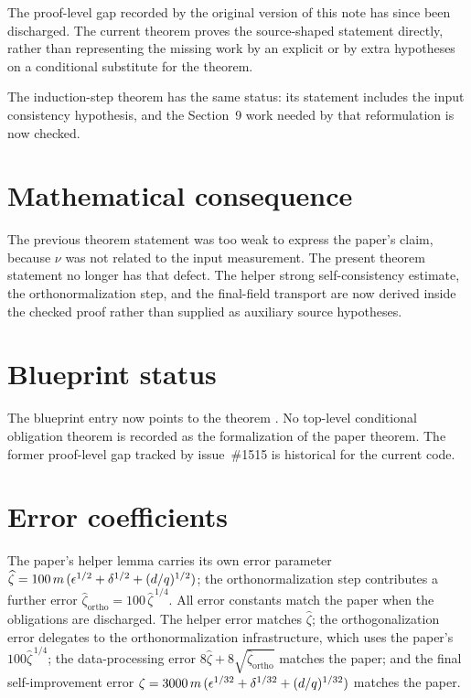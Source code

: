 \documentclass{article}
\begin{document}
The proof-level gap recorded by the original version of this note has since
been discharged.  The current theorem proves the source-shaped statement
directly, rather than representing the missing work by an explicit
 or by extra hypotheses on a conditional substitute for the
theorem.

The induction-step theorem
has the same status: its statement includes the input consistency hypothesis,
and the Section~9 work needed by that reformulation is now checked.

\section{Mathematical consequence}

The previous theorem statement was too weak to express the paper's claim,
because $\nu$ was not related to the input measurement.  The present theorem
statement no longer has that defect.  The helper strong self-consistency
estimate, the orthonormalization step, and the final-field transport are now
derived inside the checked proof rather than supplied as auxiliary source
hypotheses.

\section{Blueprint status}

The blueprint entry now points to the theorem .  No
top-level conditional obligation theorem is recorded as the formalization of
the paper theorem.  The former proof-level gap tracked by issue~\#1515 is
historical for the current code.

\section{Error coefficients}

The paper's helper lemma carries its own error parameter
$\widehat\zeta = 100\,m\,(\epsilon^{1/2}+\delta^{1/2}+(d/q)^{1/2})$;
the orthonormalization step contributes a further error
$\widehat\zeta_{\text{ortho}} = 100\,\widehat\zeta^{\,1/4}$.
All error constants match the paper when the obligations are discharged.
The helper error matches
$\widehat\zeta$; the orthogonalization error delegates to the
orthonormalization infrastructure, which uses the paper's $100\widehat\zeta^{\,1/4}$;
the data-processing error $8\widehat\zeta+8\sqrt{\widehat\zeta_{\text{ortho}}}$
matches the paper; and the final self-improvement error
$\zeta = 3000\,m\,(\epsilon^{1/32}+\delta^{1/32}+(d/q)^{1/32})$ matches the paper.
\end{document}

